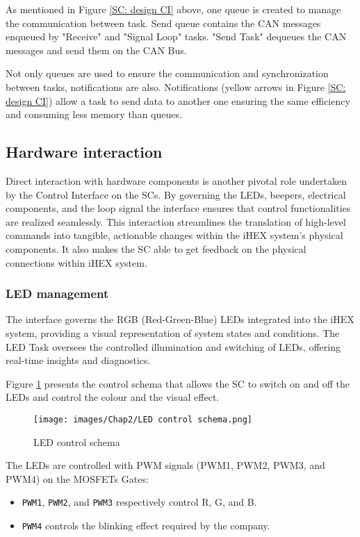 As mentioned in Figure \ref{SC: design CI} above, one queue is created to manage the communication between task. Send queue contains the CAN messages enqueued by "Receive" and "Signal Loop" tasks. "Send Task" dequeues the CAN messages and send them on the CAN Bus.

Not only queues are used to ensure the communication and synchronization between tasks, notifications are also. Notifications (yellow arrows in Figure \ref{SC: design CI}) allow a task to send data to another one ensuring the same efficiency and consuming less memory than queues.

\subsection{Hardware interaction}
Direct interaction with hardware components is another pivotal role undertaken by the Control Interface on the SCs. By governing the LEDs, beepers, electrical components, and the loop signal the interface ensures that control functionalities are realized seamlessly. This interaction streamlines the translation of high-level commands into tangible, actionable changes within the iHEX system's physical components. It also makes the SC able to get  feedback on the physical connections within iHEX system.

\subsubsection{LED management}
The interface governs the RGB (Red-Green-Blue) LEDs integrated into the iHEX system, providing a visual representation of system states and conditions. The LED Task oversees the controlled illumination and switching of LEDs, offering real-time insights and diagnostics.

Figure \ref{LED control schema} presents the control schema that allows the SC to switch on and off the LEDs and control the colour and the visual effect.

\begin{figure}[H]
\begin{center}
\texttt{[image: images/Chap2/LED control schema.png]}\\
\caption{LED control schema}
\label{LED control schema}
\end{center}
\end{figure}

The LEDs are controlled with PWM signals (PWM1, PWM2, PWM3, and PWM4) on the MOSFETs Gates:
\begin{itemize}
    \item \texttt{PWM1}, \texttt{PWM2}, and \texttt{PWM3} respectively control R, G, and B.
    \item \texttt{PWM4} controls the blinking effect required by the company.
\end{itemize}

